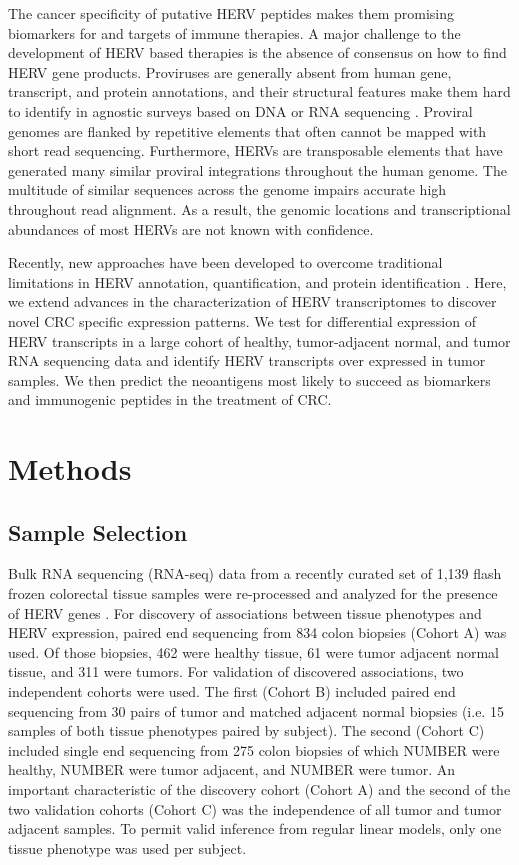 \documentclass[11pt,letterpaper]{article}
\begin{document}
The cancer specificity of putative HERV peptides makes them promising biomarkers for and targets of immune therapies.
A major challenge to the development of HERV based therapies is the absence of consensus on how to find HERV gene products.
Proviruses are generally absent from human gene, transcript, and protein annotations, and their structural features make them hard to identify in agnostic surveys based on DNA or RNA sequencing \citep{ERVmap2018, Treangen2011}.
Proviral genomes are flanked by repetitive elements that often cannot be mapped with short read sequencing.
Furthermore, HERVs are transposable elements that have generated many similar proviral integrations throughout the human genome.
The multitude of similar sequences across the genome impairs accurate high throughout read alignment.
As a result, the genomic locations and transcriptional abundances of most HERVs are not known with confidence.

Recently, new approaches have been developed to overcome traditional limitations in HERV annotation, quantification, and protein identification \citep{Attig2017, Attig2019, ERVmap2018, Telescope2019}.
Here, we extend advances in the characterization of HERV transcriptomes to discover novel CRC specific expression patterns.
We test for differential expression of HERV transcripts in a large cohort of healthy, tumor-adjacent normal, and tumor RNA sequencing data and identify HERV transcripts over expressed in tumor samples.
We then predict the neoantigens most likely to succeed as biomarkers and immunogenic peptides in the treatment of CRC.

\section*{Methods}
\subsection*{Sample Selection}
Bulk RNA sequencing (RNA-seq) data from a recently curated set of 1,139 flash frozen colorectal tissue samples were re-processed and analyzed for the presence of HERV genes \citep{Dampier2020}.
For discovery of associations between tissue phenotypes and HERV expression, paired end sequencing from 834 colon biopsies (Cohort A) was used.
Of those biopsies, 462 were healthy tissue, 61 were tumor adjacent normal tissue, and 311 were tumors.
For validation of discovered associations, two independent cohorts were used.
The first (Cohort B) included paired end sequencing from 30 pairs of tumor and matched adjacent normal biopsies (i.e. 15 samples of both tissue phenotypes paired by subject).
The second (Cohort C) included single end sequencing from 275 colon biopsies of which NUMBER were healthy, NUMBER were tumor adjacent, and NUMBER were tumor.
An important characteristic of the discovery cohort (Cohort A) and the second of the two validation cohorts (Cohort C) was the independence of all tumor and tumor adjacent samples.
To permit valid inference from regular linear models, only one tissue phenotype was used per subject.
\end{document}

